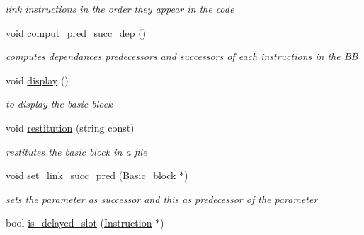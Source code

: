 \begin{DoxyCompactItemize}
\begin{DoxyCompactList}\small\item\em link instructions in the order they appear in the code \end{DoxyCompactList}\item 
\hypertarget{classBasic__block_a2f2cdedde41f78b7982e6d6d348524c2}{void \hyperlink{classBasic__block_a2f2cdedde41f78b7982e6d6d348524c2}{comput\-\_\-pred\-\_\-succ\-\_\-dep} ()}\label{classBasic__block_a2f2cdedde41f78b7982e6d6d348524c2}

\begin{DoxyCompactList}\small\item\em computes dependances predecessors and successors of each instructions in the \-B\-B \end{DoxyCompactList}\item 
\hypertarget{classBasic__block_aad79779b098ba4ccd1549a8dbbd80d7d}{void \hyperlink{classBasic__block_aad79779b098ba4ccd1549a8dbbd80d7d}{display} ()}\label{classBasic__block_aad79779b098ba4ccd1549a8dbbd80d7d}

\begin{DoxyCompactList}\small\item\em to display the basic block \end{DoxyCompactList}\item 
\hypertarget{classBasic__block_af74c4eeeecfb7a3f3fddbeb2994523a4}{void \hyperlink{classBasic__block_af74c4eeeecfb7a3f3fddbeb2994523a4}{restitution} (string const)}\label{classBasic__block_af74c4eeeecfb7a3f3fddbeb2994523a4}

\begin{DoxyCompactList}\small\item\em restitutes the basic block in a file \end{DoxyCompactList}\item 
\hypertarget{classBasic__block_acb9b80088751bcf4329b3d1532f724ac}{void \hyperlink{classBasic__block_acb9b80088751bcf4329b3d1532f724ac}{set\-\_\-link\-\_\-succ\-\_\-pred} (\hyperlink{classBasic__block}{\-Basic\-\_\-block} $\ast$)}\label{classBasic__block_acb9b80088751bcf4329b3d1532f724ac}

\begin{DoxyCompactList}\small\item\em sets the parameter as successor and this as predecessor of the parameter \end{DoxyCompactList}\item 
\hypertarget{classBasic__block_ad156275e42428ee703ffa0aa3e8b5bb0}{bool \hyperlink{classBasic__block_ad156275e42428ee703ffa0aa3e8b5bb0}{is\-\_\-delayed\-\_\-slot} (\hyperlink{classInstruction}{\-Instruction} $\ast$)}\label{classBasic__block_ad156275e42428ee703ffa0aa3e8b5bb0}


\end{DoxyCompactItemize}
